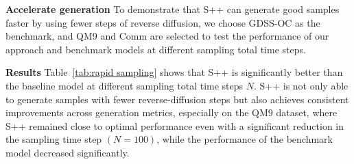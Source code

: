 \documentclass{article}
\begin{document}
\begin{table}[!t]
\caption{Novel hit ratio (\%) results ($\uparrow$).}\label{mood hit ratio}
\vspace{-3mm}
\centering
\tiny
{}
\vspace{4mm}
\caption{Novel top 5\% docking score (kcal/mol) results ($\downarrow$).}\label{mood novel hit ratio}
\vspace{-3mm}
\end{table}

\textbf{Accelerate generation} To demonstrate that S++ can generate good samples faster by using fewer steps of reverse diffusion, we choose GDSS-OC as the benchmark, and QM9 and Comm are selected to test the performance of our approach and benchmark models at different sampling total time steps. 

\textbf{Results} Table~\ref{tab:rapid sampling} shows that S++ is significantly better than the baseline model at different sampling total time steps $N$. S++ is not only able to generate samples with fewer reverse-diffusion steps but also achieves consistent improvements across generation metrics, especially on the QM9 dataset, where S++ remained close to optimal performance even with a significant reduction in the sampling time step $(N=100)$, while the performance of the benchmark model decreased significantly. 
\end{document}
